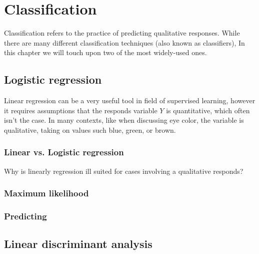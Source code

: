 \graphicspath{{Chapters/Indledning/}}

\chapter{Classification}

Classification refers to the practice of predicting qualitative responses. While there are many different classification techniques (also known as classifiers), In this chapter we will touch upon two of the most widely-used ones.

\section{Logistic regression}

Linear regression can be a very useful tool in field of supervised learning, however it requires assumptions that the responds variable $Y$ is quantitative, which often isn't the case. In many contexts, like when discussing eye color, the variable is qualitative, taking on values such blue, green, or brown.

\subsection{Linear vs. Logistic regression}

Why is linearly regression ill suited for cases involving a qualitative responds?


\subsection{Maximum likelihood}

\subsection{Predicting}

\section{Linear discriminant analysis}